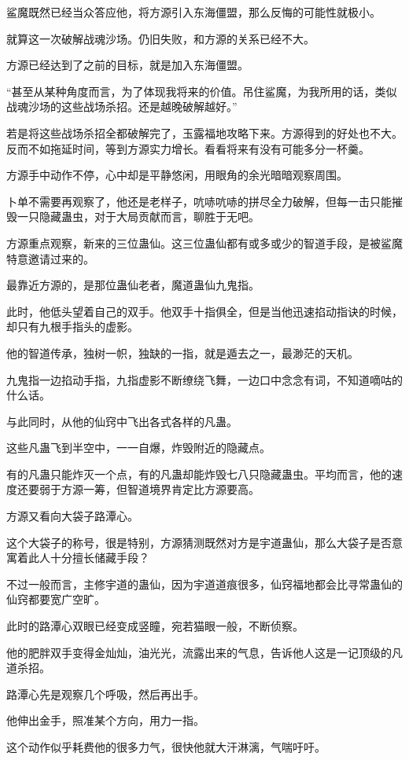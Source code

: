 \begin{this_body}
鲨魔既然已经当众答应他，将方源引入东海僵盟，那么反悔的可能性就极小。

就算这一次破解战魂沙场。仍旧失败，和方源的关系已经不大。

方源已经达到了之前的目标，就是加入东海僵盟。

“甚至从某种角度而言，为了体现我将来的价值。吊住鲨魔，为我所用的话，类似战魂沙场的这些战场杀招。还是越晚破解越好。”

若是将这些战场杀招全都破解完了，玉露福地攻略下来。方源得到的好处也不大。反而不如拖延时间，等到方源实力增长。看看将来有没有可能多分一杯羹。

方源手中动作不停，心中却是平静悠闲，用眼角的余光暗暗观察周围。

卜单不需要再观察了，他还是老样子，吭哧吭哧的拼尽全力破解，但每一击只能摧毁一只隐藏蛊虫，对于大局贡献而言，聊胜于无吧。

方源重点观察，新来的三位蛊仙。这三位蛊仙都有或多或少的智道手段，是被鲨魔特意邀请过来的。

最靠近方源的，是那位蛊仙老者，魔道蛊仙九鬼指。

此时，他低头望着自己的双手。他双手十指俱全，但是当他迅速掐动指诀的时候，却只有九根手指头的虚影。

他的智道传承，独树一帜，独缺的一指，就是遁去之一，最渺茫的天机。

九鬼指一边掐动手指，九指虚影不断缭绕飞舞，一边口中念念有词，不知道嘀咕的什么话。

与此同时，从他的仙窍中飞出各式各样的凡蛊。

这些凡蛊飞到半空中，一一自爆，炸毁附近的隐藏点。

有的凡蛊只能炸灭一个点，有的凡蛊却能炸毁七八只隐藏蛊虫。平均而言，他的速度还要弱于方源一筹，但智道境界肯定比方源要高。

方源又看向大袋子路潭心。

这个大袋子的称号，很是特别，方源猜测既然对方是宇道蛊仙，那么大袋子是否意寓着此人十分擅长储藏手段？

不过一般而言，主修宇道的蛊仙，因为宇道道痕很多，仙窍福地都会比寻常蛊仙的仙窍都要宽广空旷。

此时的路潭心双眼已经变成竖瞳，宛若猫眼一般，不断侦察。

他的肥胖双手变得金灿灿，油光光，流露出来的气息，告诉他人这是一记顶级的凡道杀招。

路潭心先是观察几个呼吸，然后再出手。

他伸出金手，照准某个方向，用力一指。

这个动作似乎耗费他的很多力气，很快他就大汗淋漓，气喘吁吁。


\end{this_body}
